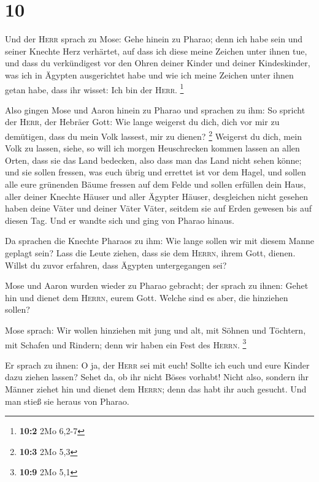 \hypertarget{section-9}{%
\section{10}\label{section-9}}

 Und der \textsc{Herr} sprach zu Mose: Gehe hinein zu
Pharao; denn ich habe sein und seiner Knechte Herz verhärtet, auf dass
ich diese meine Zeichen unter ihnen tue,  und dass du
verkündigest vor den Ohren deiner Kinder und deiner Kindeskinder, was
ich in Ägypten ausgerichtet habe und wie ich meine Zeichen unter ihnen
getan habe, dass ihr wisset: Ich bin der \textsc{Herr}. \footnote{\textbf{10:2}
  2Mo 6,2-7}

 Also gingen Mose und Aaron hinein zu Pharao und sprachen
zu ihm: So spricht der \textsc{Herr}, der Hebräer Gott: Wie lange
weigerst du dich, dich vor mir zu demütigen, dass du mein Volk lassest,
mir zu dienen? \footnote{\textbf{10:3} 2Mo 5,3}  Weigerst
du dich, mein Volk zu lassen, siehe, so will ich morgen Heuschrecken
kommen lassen an allen Orten,  dass sie das Land bedecken,
also dass man das Land nicht sehen könne; und sie sollen fressen, was
euch übrig und errettet ist vor dem Hagel, und sollen alle eure
grünenden Bäume fressen auf dem Felde  und sollen erfüllen
dein Haus, aller deiner Knechte Häuser und aller Ägypter Häuser,
desgleichen nicht gesehen haben deine Väter und deiner Väter Väter,
seitdem sie auf Erden gewesen bis auf diesen Tag. Und er wandte sich und
ging von Pharao hinaus.

 Da sprachen die Knechte Pharaos zu ihm: Wie lange sollen
wir mit diesem Manne geplagt sein? Lass die Leute ziehen, dass sie dem
\textsc{Herrn}, ihrem Gott, dienen. Willst du zuvor erfahren, dass
Ägypten untergegangen sei?

 Mose und Aaron wurden wieder zu Pharao gebracht; der
sprach zu ihnen: Gehet hin und dienet dem \textsc{Herrn}, eurem Gott.
Welche sind es aber, die hinziehen sollen?

 Mose sprach: Wir wollen hinziehen mit jung und alt, mit
Söhnen und Töchtern, mit Schafen und Rindern; denn wir haben ein Fest
des \textsc{Herrn}. \footnote{\textbf{10:9} 2Mo 5,1}

 Er sprach zu ihnen: O ja, der \textsc{Herr} sei mit
euch! Sollte ich euch und eure Kinder dazu ziehen lassen? Sehet da, ob
ihr nicht Böses vorhabt!  Nicht also, sondern ihr Männer
ziehet hin und dienet dem \textsc{Herrn}; denn das habt ihr auch
gesucht. Und man stieß sie heraus von Pharao.

